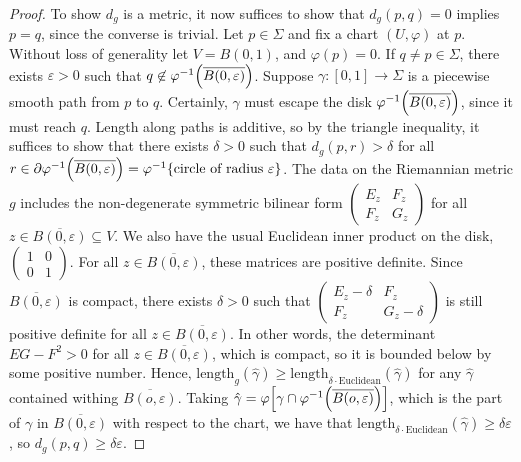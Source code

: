 \begin{proof}
	To show \( d_g \) is a metric, it now suffices to show that \( d_g(p,q) = 0 \) implies \( p = q \), since the converse is trivial.
	Let \( p \in \Sigma \) and fix a chart \( (U,\varphi) \) at \( p \).
	Without loss of generality let \( V = B(0,1) \), and \( \varphi(p) = 0 \).
	If \( q \neq p \in \Sigma \), there exists \( \varepsilon > 0 \) such that \( q \not\in \varphi^{-1} \qty(\overline{B(0,\varepsilon)}) \).
	Suppose \( \gamma \colon [0,1] \to \Sigma \) is a piecewise smooth path from \( p \) to \( q \).
	Certainly, \( \gamma \) must escape the disk \( \varphi^{-1} \qty(\overline{B(0,\varepsilon)}) \), since it must reach \( q \).
	Length along paths is additive, so by the triangle inequality, it suffices to show that there exists \( \delta > 0 \) such that \( d_g(p,r) > \delta \) for all \( r \in \partial \varphi^{-1} \qty(\overline{B(0,\varepsilon)}) = \varphi^{-1} \qty{ \text{circle of radius } \varepsilon } \).
	The data on the Riemannian metric \( g \) includes the non-degenerate symmetric bilinear form \( \begin{pmatrix}
		E_z & F_z \\
		F_z & G_z
	\end{pmatrix} \) for all \( z \in \overline{B(0,\varepsilon)} \subseteq V \).
	We also have the usual Euclidean inner product on the disk, \( \begin{pmatrix}
		1 & 0 \\
		0 & 1
	\end{pmatrix} \).
	For all \( z \in \overline{B(0,\varepsilon)} \), these matrices are positive definite.
	Since \( \overline{B(0,\varepsilon)} \) is compact, there exists \( \delta > 0 \) such that
	\( \begin{pmatrix}
		E_z - \delta & F_z \\
		F_z & G_z - \delta
	\end{pmatrix} \)
	is still positive definite for all \( z \in \overline{B(0,\varepsilon)} \).
	In other words, the determinant \( EG-F^2 > 0 \) for all \( z \in \overline{B(0,\varepsilon)} \), which is compact, so it is bounded below by some positive number.
	Hence, \( \mathrm{length}_g(\hat\gamma) \geq \mathrm{length}_{\delta \cdot \mathrm{Euclidean}}(\hat \gamma) \) for any \( \hat \gamma \) contained withing \( \overline{B(o,\varepsilon)} \).
	Taking \( \hat\gamma = \varphi \qty[ \gamma \cap \varphi^{-1}\qty(\overline{B(o,\varepsilon)}) ] \), which is the part of \( \gamma \) in \( \overline{B(0,\varepsilon)} \) with respect to the chart, we have that \( \mathrm{length}_{\delta \cdot \mathrm{Euclidean}}(\hat \gamma) \geq \delta \varepsilon \), so \( d_g(p,q) \geq \delta\varepsilon \).
\end{proof}
